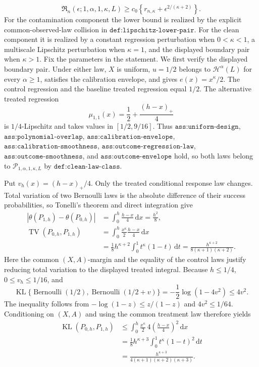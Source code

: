 \[
\mathfrak R_n(\epsilon;1,\alpha,1,\kappa,L)
\geq c_0\left\{r_{n,\kappa}+\epsilon^{2/(\kappa+2)}\right\}.
\]
For the contamination component the lower bound is realized by the explicit common-observed-law collision in \(\texttt{def:lipschitz-lower-pair}\). For the clean component it is realized by a constant regression perturbation when \(0<\kappa<1\), a multiscale Lipschitz perturbation when \(\kappa=1\), and the displayed boundary pair when \(\kappa>1\).
Fix the parameters in the statement. We first verify the displayed boundary pair. Under either law, \(X\) is uniform, \(u=1/2\) belongs to \(\mathcal H^\alpha(L)\) for every \(\alpha\geq1\), satisfies the calibration envelope, and gives \(e(x)=x^\kappa/2\). The control regression and the baseline treated regression equal \(1/2\). The alternative treated regression
\[
\mu_{1,1}(x)=\frac12+\frac{(h-x)_+}{4}
\]
is \(1/4\)-Lipschitz and takes values in \([1/2,9/16]\). Thus \(\texttt{ass:uniform-design}\), \(\texttt{ass:polynomial-overlap}\), \(\texttt{ass:calibration-envelope}\), \(\texttt{ass:calibration-smoothness}\), \(\texttt{ass:outcome-regression-law}\), \(\texttt{ass:outcome-smoothness}\), and \(\texttt{ass:outcome-envelope}\) hold, so both laws belong to \(\mathcal P_{1,\alpha,1,\kappa,L}\) by \(\texttt{def:clean-law-class}\).

Put \(v_h(x)=(h-x)_+/4\). Only the treated conditional response law changes. Total variation of two Bernoulli laws is the absolute difference of their success probabilities, so Tonelli's theorem and direct integration give
\[
\begin{aligned}
|\theta(P_{1,h})-\theta(P_{0,h})|
&=\int_0^h\frac{h-x}{4}\,\mathrm dx=\frac{h^2}{8},\\
\operatorname{TV}(P_{0,h},P_{1,h})
&=\int_0^h\frac{x^\kappa}{2}\frac{h-x}{4}\,\mathrm dx\\
&=\frac18h^{\kappa+2}\int_0^1t^\kappa(1-t)\,\mathrm dt
=\frac{h^{\kappa+2}}{8(\kappa+1)(\kappa+2)}.
\end{aligned}
\]
Here the common \((X,A)\)-margin and the equality of the control laws justify reducing total variation to the displayed treated integral. Because \(h\leq1/4\), \(0\leq v_h\leq1/16\), and
\[
\operatorname{KL}\{\operatorname{Bernoulli}(1/2),
\operatorname{Bernoulli}(1/2+v)\}
=-\frac12\log(1-4v^2)\leq4v^2.
\]
The inequality follows from \(-\log(1-z)\leq z/(1-z)\) and \(4v^2\leq1/64\). Conditioning on \((X,A)\) and using the common treatment law therefore yields
\[
\begin{aligned}
\operatorname{KL}(P_{0,h},P_{1,h})
&\leq\int_0^h\frac{x^\kappa}{2}\,4
\left(\frac{h-x}{4}\right)^2\,\mathrm dx\\
&=\frac18h^{\kappa+3}\int_0^1t^\kappa(1-t)^2\,\mathrm dt\\
&=\frac{h^{\kappa+3}}
{4(\kappa+1)(\kappa+2)(\kappa+3)}.
\end{aligned}
\]

